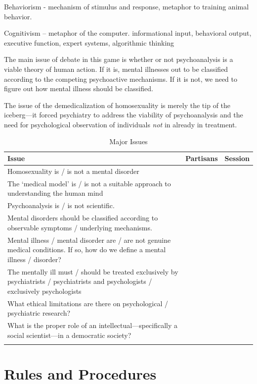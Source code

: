 Behaviorism - mechanism of stimulus and response, metaphor to training animal behavior.

Cognitivism -- metaphor of the computer. informational input, behavioral output, executive function, expert systems, algorithmic thinking

The main issue of debate in this game is whether or not psychoanalysis is a viable theory of human action. If it is, mental illnesses out to be classified according to the competing psychoactive mechanisms. If it is not, we need to figure out how mental illness should be classified.

The issue of the demedicalization of homosexuality is merely the tip of the iceberg---it forced psychiatry to address the viability of psychoanalysis and the need for psychological observation of individuals \emph{not} in already in treatment.

 \begin{longtable}[!t]{ | p{10cm} | p{3cm} |  p{1cm} | }
\hline

\textbf{Issue}&\textbf{Partisans}&\textbf{Session}\\ \hline \hline
Homosexuality is / is not a mental disorder& \\ \hline
The ‘medical model’ is / is not a suitable approach to understanding the human mind& \\ \hline
Psychoanalysis is / is not scientific.& \\ \hline
Mental disorders should be classified according to observable symptoms / underlying mechanisms.& \\ \hline
Mental illness / mental disorder are / are not genuine medical conditions. If so, how do we define a mental illness / disorder?& \\ \hline
The mentally ill must / should be treated exclusively by psychiatrists / psychiatrists and psychologists / exclusively psychologists & \\ \hline
What ethical limitations are there on psychological / psychiatric research?& \\ \hline
What is the proper role of an intellectual---specifically a social scientist---in a democratic society?& \\ \hline
\caption{Major Issues}
\label{table: major issues}
\end{longtable}


\section{Rules and Procedures}
\label{rulesandprocedures}

